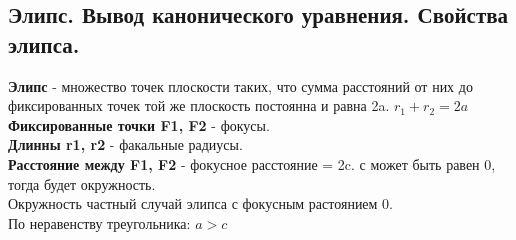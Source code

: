 \documentclass[12pt, paper]{article}
\begin{document}
\subsection{Элипс. Вывод канонического уравнения. Свойства элипса.}
\textbf{Элипс} - множество точек плоскости таких, что сумма расстояний от них до фиксированных точек той же плоскость постоянна и равна 2a. $ r_1 + r_2 = 2a $\\
\textbf{Фиксированные точки F1, F2} - фокусы.\\
\textbf{Длинны r1, r2} - факальные радиусы.\\
\textbf{Расстояние между F1, F2} - фокусное расстояние = 2c. с может быть равен 0, тогда будет окружность.\\
Окружность частный случай элипса с фокусным растоянием 0.\\
По неравенству треугольника: $ a > c $
\end{document}
